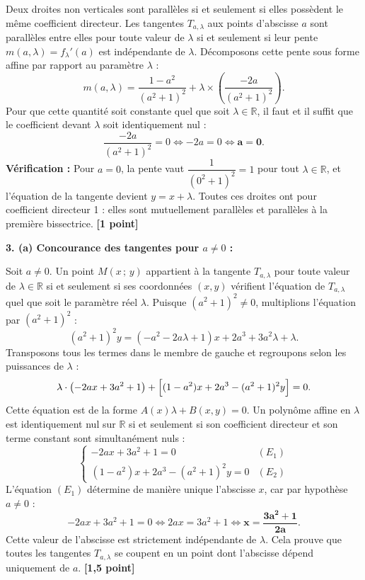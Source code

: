 \documentclass[11pt,a4paper]{article}
\newcommand{\R}{\mathbb{R}}
\begin{document}
\begin{correctionbox}
Deux droites non verticales sont parallèles si et seulement si elles possèdent le même coefficient directeur.
Les tangentes $T_{a,\lambda}$ aux points d'abscisse $a$ sont parallèles entre elles pour toute valeur de $\lambda$ si et seulement si leur pente $m(a,\lambda) = f_\lambda'(a)$ est indépendante de $\lambda$.
Décomposons cette pente sous forme affine par rapport au paramètre $\lambda$ :
\[
m(a,\lambda) = \frac{1 - a^2}{(a^2 + 1)^2} + \lambda \times \left( \frac{-2a}{(a^2 + 1)^2} \right).
\]
Pour que cette quantité soit constante quel que soit $\lambda \in \R$, il faut et il suffit que le coefficient devant $\lambda$ soit identiquement nul :
\[
\frac{-2a}{(a^2 + 1)^2} = 0 \iff -2a = 0 \iff \mathbf{a = 0}.
\]
\textbf{Vérification :} Pour $a = 0$, la pente vaut $\dfrac{1}{(0^2 + 1)^2} = 1$ pour tout $\lambda \in \R$, et l'équation de la tangente devient $y = x + \lambda$. Toutes ces droites ont pour coefficient directeur 1 : elles sont mutuellement parallèles et parallèles à la première bissectrice. \hfill \textbf{[1 point]}

\medskip
\textbf{3. (a) Concourance des tangentes pour $a \neq 0$ :}

Soit $a \neq 0$. Un point $M(x\,;\,y)$ appartient à la tangente $T_{a,\lambda}$ pour toute valeur de $\lambda \in \R$ si et seulement si ses coordonnées $(x, y)$ vérifient l'équation de $T_{a,\lambda}$ quel que soit le paramètre réel $\lambda$.
Puisque $(a^2 + 1)^2 \neq 0$, multiplions l'équation par $(a^2 + 1)^2$ :
\[
(a^2 + 1)^2 y = (-a^2 - 2a\lambda + 1)x + 2a^3 + 3a^2\lambda + \lambda.
\]
Transposons tous les termes dans le membre de gauche et regroupons selon les puissances de $\lambda$ :
\[
\lambda \cdot \bigl(-2ax + 3a^2 + 1\bigr) + \Bigl[(1 - a^2)x + 2a^3 - (a^2 + 1)^2 y\Bigr] = 0.
\]
Cette équation est de la forme $A(x) \lambda + B(x,y) = 0$.
Un polynôme affine en $\lambda$ est identiquement nul sur $\R$ si et seulement si son coefficient directeur et son terme constant sont simultanément nuls :
\[
\begin{cases}
-2ax + 3a^2 + 1 = 0 & (E_1) \\
(1 - a^2)x + 2a^3 - (a^2 + 1)^2 y = 0 & (E_2)
\end{cases}
\]
L'équation $(E_1)$ détermine de manière unique l'abscisse $x$, car par hypothèse $a \neq 0$ :
\[
-2ax + 3a^2 + 1 = 0 \iff 2ax = 3a^2 + 1 \iff \mathbf{x = \frac{3a^2 + 1}{2a}}.
\]
Cette valeur de l'abscisse est strictement indépendante de $\lambda$. Cela prouve que toutes les tangentes $T_{a,\lambda}$ se coupent en un point dont l'abscisse dépend uniquement de $a$. \hfill \textbf{[1{,}5 point]}


\end{correctionbox}
\end{document}
